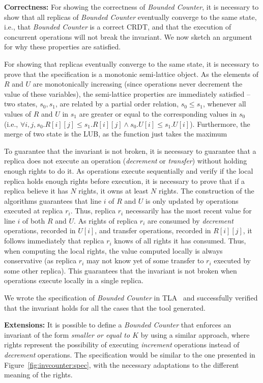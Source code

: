 \documentclass[conference]{IEEEtran}
\newcommand{\InvCounter}{\emph{Bounded Counter}}
\begin{document}
{\bf Correctness:}
For showing the correctness of \InvCounter{}, it is necessary to show 
that all replicas of \InvCounter{} eventually converge to the same state, i.e., that
\InvCounter{} is a correct CRDT, and 
that the execution of concurrent operations will not break the invariant. 
We now sketch an argument for why these properties are satisfied.

For showing that replicas eventually converge to the same state, 
it is necessary to prove that the specification is a monotonic semi-lattice object. 
As the elements of $R$ and $U$ are monotonically increasing (since operations never 
decrement the value of these variables), the semi-lattice properties are 
immediately satisfied -- two states, $s_0, s_1$, are related by a partial order 
relation, $s_0 \le s_1$, whenever all values of $R$ and $U$ in $s_1$ are greater 
or equal to the corresponding values in $s_0$ 
(i.e., $\forall i, j, s_0.R[i][j] \leq s_1.R[i][j] \wedge s_0.U[i] \leq s_1.U[i]$).
Furthermore, the merge of two state is the LUB, as the function just takes the maximum 

To guarantee that the invariant is not broken, it is necessary to guarantee 
that a replica does not execute an operation (\emph{decrement} or \emph{transfer}) 
without holding enough rights to do it. 
As operations execute sequentially and verify if the local replica holds enough 
rights before execution, 
it is necessary to prove that if a replica believe it has $N$ rights, 
it owns at least $N$ rights. 
The construction of the algorithms guarantees that line $i$ of $R$ and $U$ is only updated by operations 
executed at replica $r_i$. Thus, replica $r_i$ necessarily has the most recent value 
for line $i$ of both $R$ and $U$. 
As rights of replica $r_i$ are consumed by \emph{decrement} operations, recorded in $U[i]$, 
and transfer operations, recorded in $R[i][j]$, it follows immediately that replica 
$r_i$ knows of all rights it has consumed. 
Thus, when computing the local rights, the value computed locally is always conservative 
(as replica $r_i$ may not know yet of some transfer to $r_i$ executed by some other replica).
This guarantees that the invariant is not broken when operations 
execute locally in a single replica.

We wrote the specification of \InvCounter{} in TLA~\cite{tla} and 
successfully verified that the invariant holds for all the cases that the tool generated.

{\bf Extensions:}
It is possible to define a \InvCounter{} that enforces an invariant 
of the form \emph{smaller or equal to $K$} by using a similar approach, 
where rights represent the possibility of executing \emph{increment} operations 
instead of \emph{decrement} operations. 
The specification would be similar to the one presented in 
Figure~\ref{fig:invcounter:spec}, with the necessary adaptations to the 
different meaning of the rights.
\end{document}
